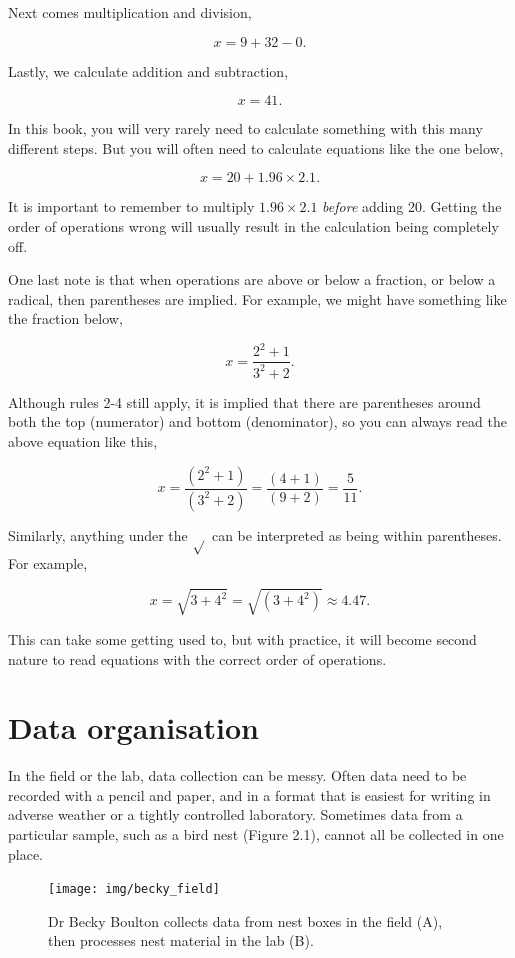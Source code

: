 \documentclass[
  openany]{krantz}
\begin{document}
Next comes multiplication and division,

\[x = 9 + 32 -  0.\]

Lastly, we calculate addition and subtraction,

\[x = 41.\]

In this book, you will very rarely need to calculate something with this many different steps.
But you will often need to calculate equations like the one below,

\[x = 20 + 1.96 \times 2.1.\]

It is important to remember to multiply \(1.96 \times 2.1\) \emph{before} adding 20.
Getting the order of operations wrong will usually result in the calculation being completely off.

One last note is that when operations are above or below a fraction, or below a radical, then parentheses are implied.
For example, we might have something like the fraction below,

\[x = \frac{2^{2} + 1}{3^{2} +2}.\]

Although rules 2-4 still apply, it is implied that there are parentheses around both the top (numerator) and bottom (denominator), so you can always read the above equation like this,

\[x = \frac{\left(2^{2} + 1\right)}{\left(3^{2} + 2\right)} = \frac{\left(4 + 1\right)}{\left(9 + 2\right)} = \frac{5}{11}.\]

Similarly, anything under the \(\sqrt{}\) can be interpreted as being within parentheses.
For example,

\[x = \sqrt{3 + 4^{2}} = \sqrt{\left(3 + 4^{2} \right)} \approx 4.47.\]

This can take some getting used to, but with practice, it will become second nature to read equations with the correct order of operations.

\hypertarget{Chapter_2}{%
\chapter{Data organisation}\label{Chapter_2}}

In the field or the lab, data collection can be messy.
Often data need to be recorded with a pencil and paper, and in a format that is easiest for writing in adverse weather or a tightly controlled laboratory.
Sometimes data from a particular sample, such as a bird nest (Figure 2.1), cannot all be collected in one place.

\begin{figure}
\texttt{[image: img/becky\_field]} \caption{Dr Becky Boulton collects data from nest boxes in the field (A), then processes nest material in the lab (B).}\label{fig:unnamed-chunk-3}
\end{figure}
\end{document}
